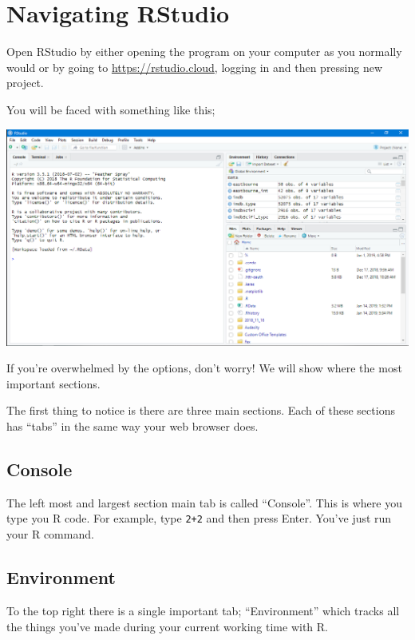 \documentclass[]{book}
\begin{document}
\hypertarget{navigating-rstudio}{%
\section{Navigating RStudio}\label{navigating-rstudio}}

Open RStudio by either opening the program on your computer as you normally would or by going to \url{https://rstudio.cloud}, logging in and then pressing new project.

You will be faced with something like this;

\includegraphics[width=\textwidth,height=\textheight]{Images/RStudio}

If you're overwhelmed by the options, don't worry! We will show where the most important sections.

The first thing to notice is there are three main sections. Each of these sections has ``tabs'' in the same way your web browser does.

\hypertarget{console}{%
\subsection{Console}\label{console}}

The left most and largest section main tab is called ``Console''. This is where you type you R code. For example, type \texttt{2+2} and then press Enter. You've just run your R command.

\hypertarget{environment}{%
\subsection{Environment}\label{environment}}

To the top right there is a single important tab; ``Environment'' which tracks all the things you've made during your current working time with R.
\end{document}
